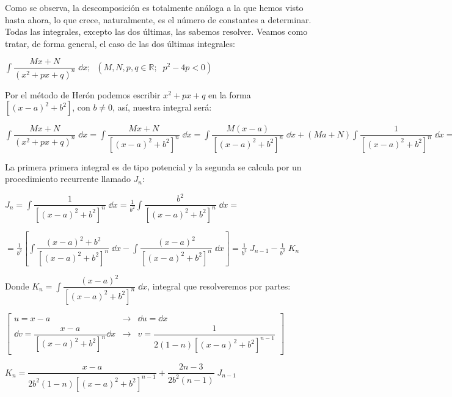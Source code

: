 { \textcolor{gris}{
 Como se observa, la descomposición es totalmente análoga a la que hemos visto hasta ahora, lo que crece, naturalmente, es el número de constantes a determinar. Todas las integrales, excepto las dos últimas, las sabemos resolver. Veamos como tratar, de forma general, el caso de las dos últimas integrales:}
 
 \textcolor{gris}{
 $\displaystyle \int  \dfrac {Mx+N}{(x^2+px+q)^n} \; \dd x; \;\;  (M,N,p,q\in \mathbb R; \;\;  p^2-4p<0)$}

\textcolor{gris}{ 
 Por el método de Herón podemos escribir $x^2+px+q$ en la forma $\displaystyle \left[(x-a)^2+b^2  \right]$, con $b\neq 0$, así, nuestra integral será:}
 
 \textcolor{gris}{
 $\displaystyle \int  \dfrac {Mx+N}{(x^2+px+q)^n} \; \dd x = \int  \dfrac {Mx+N}{\left[(x-a)^2+b^2  \right]^n} \; \dd x =\int  \dfrac {M(x-a)}{\left[(x-a)^2+b^2  \right]^n} \; \dd x + 
 (Ma+N)\int  \dfrac {1}{\left[(x-a)^2+b^2  \right]^n} \; \dd x=
 \frac M 2 \int  \dfrac {2(x-a)}{\left[(x-a)^2+b^2  \right]^n} \; \dd x + 
 (Ma+N)\int  \dfrac {1}{\left[(x-a)^2+b^2  \right]^n} \; \dd x$}

\textcolor{gris}{
La primera primera integral es de tipo potencial y la segunda se calcula por un procedimiento recurrente llamado $J_n$:}

\textcolor{gris}{
$J_n= \displaystyle \int  \dfrac {1}{\left[(x-a)^2+b^2  \right]^n} \; \dd x =\frac {1}{b^2} \int  \dfrac {b^2}{\left[(x-a)^2+b^2  \right]^n} \; \dd x =$}

\textcolor{gris}{
$= \displaystyle \frac {1}{b^2} \left[  \int  \dfrac {(x-a)^2+b^2}{\left[(x-a)^2+b^2  \right]^n} \; \dd x
- \int  \dfrac {(x-a)^2}{\left[(x-a)^2+b^2  \right]^n} \; \dd x      \right] = \frac {1}{b^2}\; J_{n-1}-\frac {1}{b^2}\; K_n$}

\textcolor{gris}{
Donde $K_n=\displaystyle \int  \dfrac {(x-a)^2}{\left[(x-a)^2+b^2  \right]^n} \; \dd x $, integral que resolveremos por partes:}

\textcolor{gris}{
$\left[ \begin{matrix} u=x-a & \to & \dd u = \dd x \\
 \dd v = \dfrac {x-a}{\left[(x-a)^2+b^2  \right]^n} \dd x& \to & v= \dfrac {1}{2(1-n)\left[(x-a)^2+b^2  \right]^{n-1}}\end{matrix} \right]$}
 
 \textcolor{gris}{
 $K_n= \displaystyle \dfrac {x-a}{2b^2(1-n) \left[(x-a)^2+b^2  \right]^{n-1} } + \dfrac {2n-3}{2b^2 (n-1)} \; J_{n-1} $}
 
}
